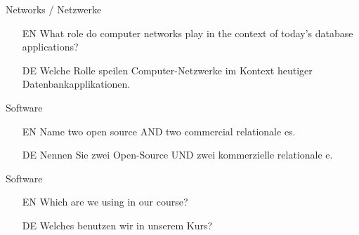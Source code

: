 %
\begin{question}{Networks / Netzwerke}%
\begin{itemize}%
\item[EN] What role do computer networks play in the context of today's database applications?%
\item[DE] Welche Rolle speilen Computer-Netzwerke im Kontext heutiger Datenbankapplikationen.%
\end{itemize}%
\end{question}%
%
\begin{question}{Software}%
\begin{itemize}%
\item[EN] Name two open source AND two commercial relationale es.%
\item[DE] Nennen Sie zwei Open-Source UND zwei kommerzielle relationale e.%
\end{itemize}%
\end{question}%
%
\begin{question}{Software}%
\begin{itemize}%
\item[EN] Which  are we using in our course?%
\item[DE] Welches  benutzen wir in unserem Kurs?%
\end{itemize}%
\end{question}%
%
\endhsection%
